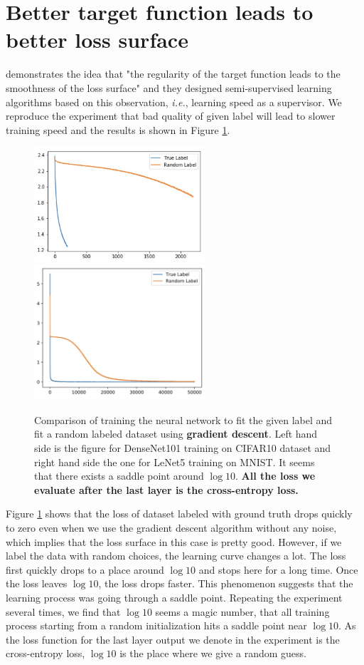 \documentclass{article}
\theoremstyle{plain}
\theoremstyle{definition}
\begin{document}
\section{Better target function leads to better loss surface}

\cite{cicek2018saas,cicek2018input} demonstrates the idea that "the regularity of the target function leads to the smoothness of the loss surface" and they designed semi-supervised learning algorithms based on this observation, \emph{i.e.}, learning speed as a supervisor. We reproduce the experiment that bad quality of given label will lead to slower training speed and the results is shown in Figure \ref{saas}.

\begin{figure}[htp]
	\centering
	\includegraphics[width=2.5in]{cifar.jpeg}
	\includegraphics[width=2.5in]{mnist.jpg}
	\caption{Comparison of training the neural network to fit the given label and fit a random labeled dataset using \textbf{gradient descent}. Left hand side is the figure for DenseNet101 training on CIFAR10 dataset and right hand side the one for LeNet5 training on MNIST. It seems that there exists a saddle point around $\log 10$. \textbf{All the loss we evaluate after the last layer is the cross-entropy loss.}}
	\label{saas}
\end{figure}

Figure \ref{saas} shows that the loss of dataset labeled with ground truth drops quickly to zero even when we use the gradient descent algorithm without any noise, which implies that the loss surface in this case is pretty good. However, if we label the data with random choices, the learning curve changes a lot. The loss first quickly drops to a place around $\log 10$ and stops here for a long time. Once the loss leaves $\log 10$, the loss drops faster. This phenomenon suggests that the learning process was going through a saddle point. Repeating the experiment several times, we find that $\log10$ seems a magic number, that all training process starting from a random initialization hits a saddle point near $\log 10$. As the loss function for the last layer output we denote in the experiment is the cross-entropy loss, $\log 10$ is the place where we give a random guess.
\end{document}
